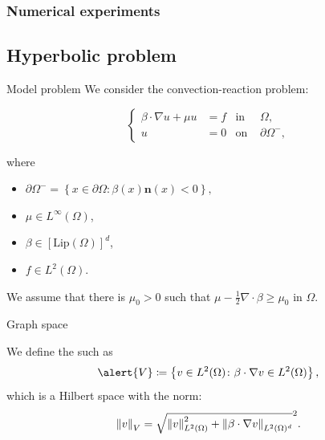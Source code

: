 \subsubsection{Numerical experiments}

\subsection{Hyperbolic problem}

\begin{frame}{Model problem}
	We consider the convection-reaction problem:
	\begin{block}{}
	\begin{equation*}
	\left\{
	\begin{aligned}
	\beta\cdot\nabla u+\mu u&=f & \text{in } &\Omega, \\
	u&=0 & \text{on } &\partial\Omega^-,
	\end{aligned}
	\right.
	\end{equation*}
	\end{block}
	where 
	\begin{itemize}
		\item $\partial\Omega^-=\left\{x\in\partial\Omega\colon \beta(x)\mathbf{n}(x)<0\right\},$
		\item $\mu\in L^\infty(\Omega)$,
		\item $\beta\in\left[\text{Lip}(\Omega)\right]^d$,
		\item $f\in L^2(\Omega)$.
	\end{itemize}
	\vspace*{.5cm}
	We assume that there is $\mu_0>0$ such that $\displaystyle\mu-\frac{1}{2}\nabla\cdot\beta\geq\mu_0$ in $\Omega$.
	
	\end{frame}
	
	\begin{frame}{Graph space}
	
	\begin{definicion}
	We define the  such as $$\alert{V}\coloneqq\left\{v\in L^2(\Omega)\colon\beta\cdot\nabla v\in L^2(\Omega) \right\},$$
	which is a Hilbert space with the norm:
	$$
	\left\|v\right\|_V=\sqrt{\left\|v\right\|_{L^2(\Omega)}^2+\left\|\beta\cdot\nabla v\right\|_{L^2(\Omega)^d}}^2.
	$$
	\end{definicion}
	\end{frame}
	

